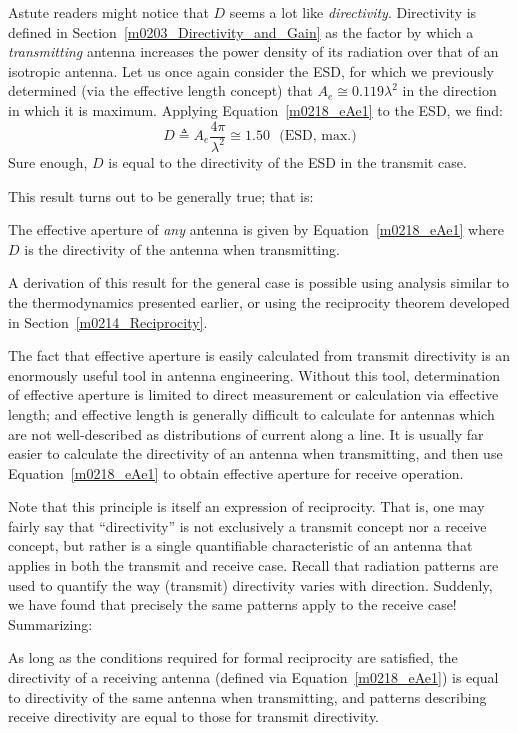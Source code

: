 Astute readers might notice that $D$ seems a lot like \emph{directivity}.
Directivity is defined in Section~\ref{m0203_Directivity_and_Gain} as the factor by which a \emph{transmitting} antenna increases the power density of its radiation over that of an isotropic antenna.
Let us once again consider the ESD, for which we previously determined (via the effective length concept) that $A_e\cong 0.119\lambda^2$ in the direction in which it is maximum.
Applying Equation~\ref{m0218_eAe1} to the ESD, we find:
%
\begin{equation}
D \triangleq A_e \frac{4\pi}{\lambda^2}  \cong 1.50 ~~~\mbox{(ESD, max.)}
\end{equation}
%
Sure enough, $D$ is equal to the directivity of the ESD in the transmit case.

This result turns out to be generally true; that is:
%
\begin{mdframed}[backgroundcolor=yellow!20,nobreak=true] 
The effective aperture of \emph{any} antenna is given by Equation~\ref{m0218_eAe1} where $D$ is the directivity of the antenna when transmitting.
\end{mdframed}
%
A derivation of this result for the general case is possible using analysis similar to the thermodynamics presented earlier, or using the reciprocity theorem developed in Section~\ref{m0214_Reciprocity}.

The fact that effective aperture is easily calculated from transmit directivity is an enormously useful tool in antenna engineering.
Without this tool, determination of effective aperture is limited to direct measurement or calculation via effective length; and effective length is generally difficult to calculate for antennas which are not well-described as distributions of current along a line.
It is usually far easier to calculate the directivity of an antenna when transmitting, and then use Equation~\ref{m0218_eAe1} to obtain effective aperture for receive operation.

Note that this principle is itself an expression of reciprocity.
That is, one may fairly say that ``directivity'' is not exclusively a transmit concept nor a receive concept, but rather is a single quantifiable characteristic of an antenna that applies in both the transmit and receive case.
Recall that radiation patterns 
are used to quantify the way (transmit) directivity varies with direction.
Suddenly, we have found that precisely the same patterns apply to the receive case!
Summarizing:
%
\begin{mdframed}[backgroundcolor=yellow!20,nobreak=true] 
As long as the conditions required for formal reciprocity are satisfied, the directivity of a receiving antenna (defined via Equation~\ref{m0218_eAe1}) is equal to directivity of the same antenna when transmitting, and patterns describing receive directivity are equal to those for transmit directivity.
\end{mdframed}

